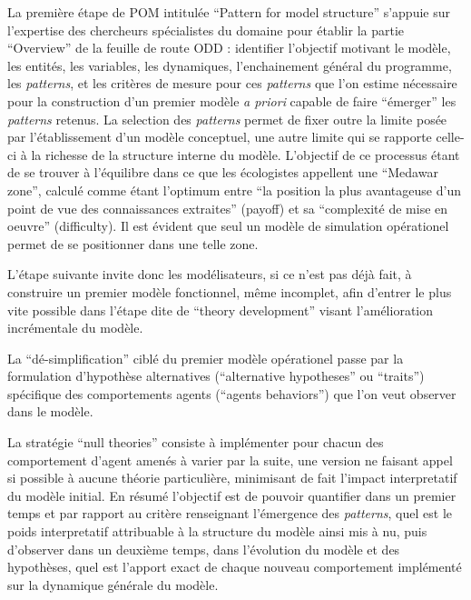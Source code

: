 
La première étape de POM intitulée \foreignquote{english}{Pattern for model structure} s'appuie sur l'expertise des chercheurs spécialistes du domaine pour établir la partie \foreignquote{english}{Overview} de la feuille de route ODD : identifier l'objectif motivant le modèle, les entités, les variables, les dynamiques, l'enchainement général du programme, les \textit{patterns}, et les critères de mesure pour ces \textit{patterns} que l'on estime nécessaire pour la construction d'un premier modèle \textit{a priori} capable de faire \enquote{émerger} les \textit{patterns} retenus. La selection des \textit{patterns} permet de fixer outre la limite posée par l'établissement d'un modèle conceptuel, une autre limite qui se rapporte celle-ci à la richesse de la structure interne du modèle. L'objectif de ce processus étant de se trouver à l'équilibre dans ce que les écologistes appellent une \enquote{Medawar zone}, calculé comme étant l'optimum entre \enquote{la position la plus avantageuse d'un point de vue des connaissances extraites} (payoff) et sa \enquote{complexité de mise en oeuvre} (difficulty). Il est évident que seul un modèle de simulation opérationel permet de se positionner dans une telle zone. 

L'étape suivante invite donc les modélisateurs, si ce n'est pas déjà fait, à construire un premier modèle fonctionnel, même incomplet, afin d'entrer le plus vite possible dans l'étape dite de \foreignquote{english}{theory development} visant l'amélioration incrémentale du modèle.

La \enquote{dé-simplification} ciblé du premier modèle opérationel passe par la formulation d'hypothèse alternatives (\foreignquote{english}{alternative hypotheses} ou \foreignquote{english}{traits}) spécifique des comportements agents (\foreignquote{english}{agents behaviors}) que l'on veut observer dans le modèle.  

La stratégie \enquote{null theories}   consiste à implémenter pour chacun des comportement d'agent amenés à varier par la suite, une version ne faisant appel si possible à aucune théorie particulière, minimisant de fait l'impact interpretatif du modèle initial. En résumé l'objectif est de pouvoir quantifier dans un premier temps et par rapport au critère renseignant l'émergence des \textit{patterns}, quel est le poids interpretatif attribuable à la structure du modèle ainsi mis à nu, puis d'observer dans un deuxième temps, dans l'évolution du modèle et des hypothèses, quel est l'apport exact de chaque nouveau comportement implémenté sur la dynamique générale du modèle.

